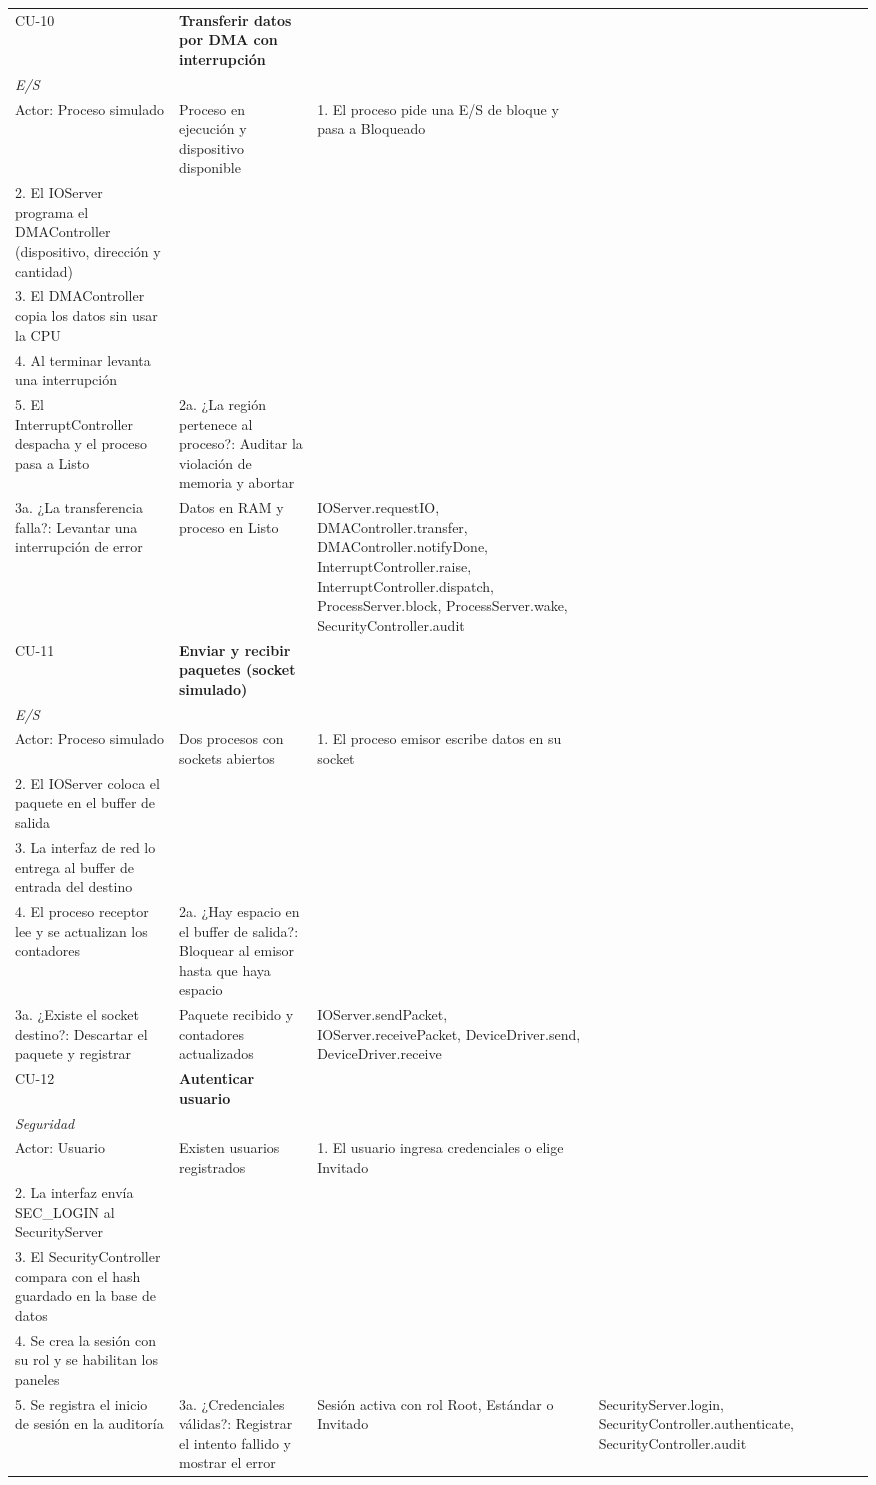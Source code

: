 \documentclass[conference]{IEEEtran}
\begin{document}
\begin{table}[!t]
\begin{tabular}{|>{\raggedright}p{0.8cm}|>{\raggedright}p{2.1cm}|>{\raggedright}p{1.7cm}|>{\raggedright}p{4.7cm}|>{\raggedright}p{2.9cm}|>{\raggedright}p{1.8cm}|>{\raggedright}p{2.9cm}|}
CU-10 & \textbf{Transferir datos por DMA con interrupción}\\ \textit{E/S}\\ Actor: Proceso simulado & Proceso en ejecución y dispositivo disponible & 1. El proceso pide una E/S de bloque y pasa a Bloqueado\\ 2. El IOServer programa el DMAController (dispositivo, dirección y cantidad)\\ 3. El DMAController copia los datos sin usar la CPU\\ 4. Al terminar levanta una interrupción\\ 5. El InterruptController despacha y el proceso pasa a Listo & 2a. ¿La región pertenece al proceso?: Auditar la violación de memoria y abortar\\ 3a. ¿La transferencia falla?: Levantar una interrupción de error & Datos en RAM y proceso en Listo & IOServer.\allowbreak requestIO, DMAController.\allowbreak transfer, DMAController.\allowbreak notifyDone, InterruptController.\allowbreak raise, InterruptController.\allowbreak dispatch, ProcessServer.\allowbreak block, ProcessServer.\allowbreak wake, SecurityController.\allowbreak audit\tabularnewline \hline
CU-11 & \textbf{Enviar y recibir paquetes (socket simulado)}\\ \textit{E/S}\\ Actor: Proceso simulado & Dos procesos con sockets abiertos & 1. El proceso emisor escribe datos en su socket\\ 2. El IOServer coloca el paquete en el buffer de salida\\ 3. La interfaz de red lo entrega al buffer de entrada del destino\\ 4. El proceso receptor lee y se actualizan los contadores & 2a. ¿Hay espacio en el buffer de salida?: Bloquear al emisor hasta que haya espacio\\ 3a. ¿Existe el socket destino?: Descartar el paquete y registrar & Paquete recibido y contadores actualizados & IOServer.\allowbreak sendPacket, IOServer.\allowbreak receivePacket, DeviceDriver.\allowbreak send, DeviceDriver.\allowbreak receive\tabularnewline \hline
CU-12 & \textbf{Autenticar usuario}\\ \textit{Seguridad}\\ Actor: Usuario & Existen usuarios registrados & 1. El usuario ingresa credenciales o elige Invitado\\ 2. La interfaz envía SEC\_LOGIN al SecurityServer\\ 3. El SecurityController compara con el hash guardado en la base de datos\\ 4. Se crea la sesión con su rol y se habilitan los paneles\\ 5. Se registra el inicio de sesión en la auditoría & 3a. ¿Credenciales válidas?: Registrar el intento fallido y mostrar el error & Sesión activa con rol Root, Estándar o Invitado & SecurityServer.\allowbreak login, SecurityController.\allowbreak authenticate, SecurityController.\allowbreak audit\tabularnewline \hline

\end{tabular}
\end{table}
\end{document}
